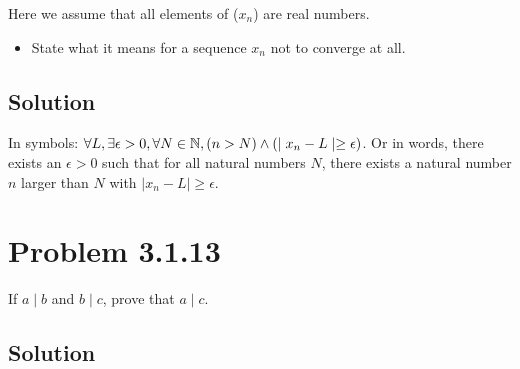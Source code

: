 \documentclass[12pt]{extarticle}
\begin{document}
Here we assume that all elements of ($x_{n}$) are real numbers. 

\begin{itemize}
	\item State what it means for a sequence $x_n$ not to converge at all. 
\end{itemize}

\subsection*{Solution}

In symbols: $\forall L, \exists \epsilon > 0, \forall N \in \mathbb{N}, \qty(n > N) \land \qty(\mid x_n - L\mid  \geq \epsilon)$. Or in words, there exists an $\epsilon > 0$ such that for all natural numbers $N$, there exists a natural number $n$ larger than $N$ with $\mid x_n - L\mid  \geq \epsilon$.

%
%

\section*{Problem 3.1.13}

If $a \mid  b$ and $b \mid  c$, prove that $a \mid  c$.

\subsection*{Solution}
\end{document}
